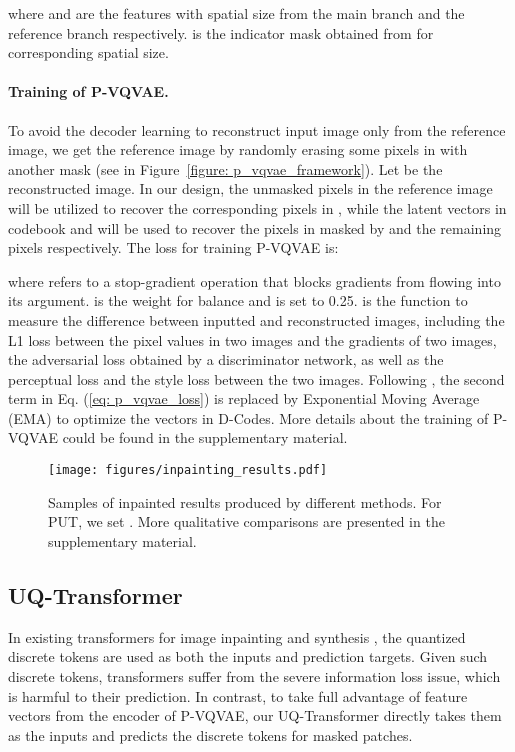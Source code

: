\documentclass[10pt,twocolumn,letterpaper]{article}
\newcommand{\Fref}[1]{Figure~\ref{#1}}
\begin{document}
where  and  are the features with spatial size  from the main branch and the reference branch respectively.  is the indicator mask obtained from  for corresponding spatial size.


\paragraph{Training of P-VQVAE.}
To avoid the decoder learning to reconstruct input image  only from the reference image, we get the reference image by randomly erasing some pixels in  with another mask  (see in \Fref{figure: p_vqvae_framework}). Let  be the reconstructed image. In our design, the unmasked pixels in the reference image will be utilized to recover the corresponding pixels in , while the latent vectors in codebook  and  will be used to recover the pixels in  masked by  and the remaining pixels respectively. The loss for training P-VQVAE is:

where 
 refers to a stop-gradient operation that blocks gradients from flowing into its argument.
 is the weight for balance and is set to 0.25.  is the function to measure the difference between inputted and reconstructed images, including the L1 loss between the pixel values in two images and the gradients of two images, the adversarial loss\cite{goodfellow2014generative} obtained by a discriminator network, as well as the perceptual loss \cite{johnson2016perceptual} and the style loss\cite{gatys2016image}  between the two images.
Following \cite{van2017neural,razavi2019generating}, the second term in Eq. (\ref{eq: p_vqvae_loss}) is replaced by Exponential Moving Average (EMA) to optimize the vectors in D-Codes. More details about the training of P-VQVAE could be found in the supplementary material.




\begin{figure*}[t]
	\centering
	\texttt{[image: figures/inpainting\_results.pdf]} 
    \vspace{-5pt}
	\caption{Samples of inpainted results produced by different methods. For PUT, we set . More qualitative comparisons are presented in the supplementary material.}
	\vspace{-8pt}
	\label{figure: inpainting_results}
\end{figure*}

\subsection{UQ-Transformer}
\label{sec: ut_transformer}
In existing transformers for image inpainting \cite{wan2021high} and synthesis \cite{esser2021taming, ramesh2021zero}, the quantized discrete tokens are used as both the inputs and prediction targets. Given such discrete tokens, transformers
suffer from the severe information loss issue, which is harmful to their prediction.
In contrast, to take full advantage of feature vectors  from the encoder of P-VQVAE, our UQ-Transformer directly takes them as the inputs and predicts the discrete tokens for masked patches.
\end{document}
